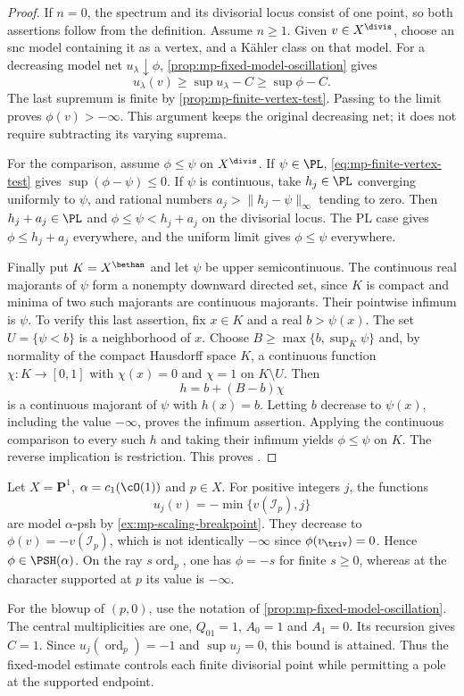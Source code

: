 \begin{proof}
If $n=0$, the spectrum and its divisorial locus consist of one point, so both assertions follow from the definition. Assume $n\geq1$. Given $v\in X^{\divis}$, choose an snc model containing it as a vertex, and a K\"ahler class on that model. For a decreasing model net $u_\lambda\downarrow\phi$, \cref{prop:mp-fixed-model-oscillation} gives
\[
 u_\lambda(v)\geq\sup u_\lambda-C\geq\sup\phi-C.
\]
The last supremum is finite by \cref{prop:mp-finite-vertex-test}. Passing to the limit proves $\phi(v)>-\infty$. This argument keeps the original decreasing net; it does not require subtracting its varying suprema.

For the comparison, assume $\phi\leq\psi$ on $X^{\divis}$. If $\psi\in\PL$, \eqref{eq:mp-finite-vertex-test} gives $\sup(\phi-\psi)\leq0$. If $\psi$ is continuous, take $h_j\in\PL$ converging uniformly to $\psi$, and rational numbers $a_j>\|h_j-\psi\|_\infty$ tending to zero. Then $h_j+a_j\in\PL$ and $\phi\leq\psi<h_j+a_j$ on the divisorial locus. The PL case gives $\phi\leq h_j+a_j$ everywhere, and the uniform limit gives $\phi\leq\psi$ everywhere.

Finally put $K=X^{\bethan}$ and let $\psi$ be upper semicontinuous. The continuous real majorants of $\psi$ form a nonempty downward directed set, since $K$ is compact and minima of two such majorants are continuous majorants. Their pointwise infimum is $\psi$. To verify this last assertion, fix $x\in K$ and a real $b>\psi(x)$. The set $U=\{\psi<b\}$ is a neighborhood of $x$. Choose $B\geq\max\{b,\sup_K\psi\}$ and, by normality of the compact Hausdorff space $K$, a continuous function $\chi:K\to[0,1]$ with $\chi(x)=0$ and $\chi=1$ on $K\setminus U$. Then
\[
                        h=b+(B-b)\chi
\]
is a continuous majorant of $\psi$ with $h(x)=b$. Letting $b$ decrease to $\psi(x)$, including the value $-\infty$, proves the infimum assertion. Applying the continuous comparison to every such $h$ and taking their infimum yields $\phi\leq\psi$ on $K$. The reverse implication is restriction. This proves \cite[Theorem~4.3.8, p.~42]{MPTropicalV2}.
\end{proof}

\begin{example}\label{ex:mp-divisorial-finiteness-boundary}
Let $X=\mathbf P^1$, $\alpha=c_1(\cO(1))$ and $p\in X$. For positive integers $j$, the functions
\[
                    u_j(v)=-\min\{v(\mathcal I_p),j\}
\]
are model $\alpha$-psh by \cref{ex:mp-scaling-breakpoint}. They decrease to $\phi(v)=-v(\mathcal I_p)$, which is not identically $-\infty$ since $\phi(v_{\triv})=0$. Hence $\phi\in\PSH(\alpha)$. On the ray $s\operatorname{ord}_p$, one has $\phi=-s$ for finite $s\geq0$, whereas at the character supported at $p$ its value is $-\infty$.

For the blowup of $(p,0)$, use the notation of \cref{prop:mp-fixed-model-oscillation}. The central multiplicities are one, $Q_{01}=1$, $A_0=1$ and $A_1=0$. Its recursion gives $C=1$. Since $u_j(\operatorname{ord}_p)=-1$ and $\sup u_j=0$, this bound is attained. Thus the fixed-model estimate controls each finite divisorial point while permitting a pole at the supported endpoint.
\end{example}

